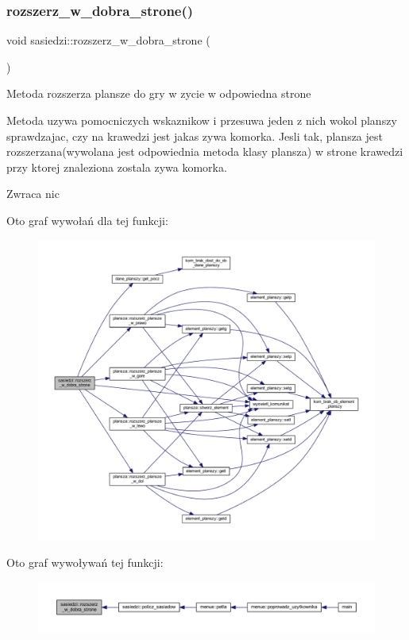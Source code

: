 \subsubsection{\texorpdfstring{rozszerz\+\_\+w\+\_\+dobra\+\_\+strone()}{rozszerz\_w\_dobra\_strone()}}
{\footnotesize\ttfamily void sasiedzi\+::rozszerz\+\_\+w\+\_\+dobra\+\_\+strone (\begin{DoxyParamCaption}{ }\end{DoxyParamCaption})}

Metoda rozszerza plansze do gry w zycie w odpowiedna strone

Metoda uzywa pomocniczych wskaznikow i przesuwa jeden z nich wokol planszy sprawdzajac, czy na krawedzi jest jakas zywa komorka. Jesli tak, plansza jest rozszerzana(wywolana jest odpowiednia metoda klasy plansza) w strone krawedzi przy ktorej znaleziona zostala zywa komorka. \begin{DoxyReturn}{Zwraca}
nic 
\end{DoxyReturn}
Oto graf wywołań dla tej funkcji\+:
\nopagebreak
\begin{figure}[H]
\begin{center}
\leavevmode
\includegraphics[width=350pt]{classsasiedzi_a1c5e1efc2810b7d408012cf3a82cf719_cgraph}
\end{center}
\end{figure}
Oto graf wywoływań tej funkcji\+:
\nopagebreak
\begin{figure}[H]
\begin{center}
\leavevmode
\includegraphics[width=350pt]{classsasiedzi_a1c5e1efc2810b7d408012cf3a82cf719_icgraph}
\end{center}
\end{figure}
\mbox{\label{classsasiedzi_a5d5fc98d8d077013af180ea83404c7a8}} 
